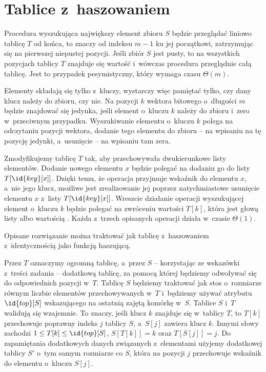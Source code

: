 \chapter{Tablice z~haszowaniem}


\exercise %
Procedura wyszukująca największy element zbioru $S$ będzie przeglądać liniowo tablicę $T$ od końca, to znaczy od indeksu $m-1$ ku jej początkowi, zatrzymując się na pierwszej niepustej pozycji. Jeśli zbiór $S$ jest pusty, to na wszystkich pozycjach tablicy $T$ znajduje się wartość  i~wówczas procedura przeglądnie całą tablicę. Jest to przypadek pesymistyczny, który wymaga czasu $\Theta(m)$.

\exercise %
Elementy składają się tylko z~kluczy, wystarczy więc pamiętać tylko, czy dany klucz należy do zbioru, czy nie. Na pozycji $k$ wektora bitowego o~długości $m$ będzie znajdować się jedynka, jeśli element o~kluczu $k$ należy do zbioru i~zero w~przeciwnym przypadku. Wyszukiwanie elementu o~kluczu $k$ polega na odczytaniu  pozycji wektora, dodanie tego elementu do zbioru -- na wpisaniu na tę pozycję jedynki, a~usunięcie -- na wpisaniu tam zera.

\exercise %
Zmodyfikujemy tablicę $T$ tak, aby przechowywała dwukierunkowe listy elementów. Dodanie nowego elementu $x$ będzie polegać na dodaniu go do listy $T[\id{key}[x]]$. Dzięki temu, że operacja  przyjmuje wskaźnik do elementu $x$, a~nie jego klucz, możliwe jest zrealizowanie jej poprzez natychmiastowe usunięcie elementu $x$ z~listy $T[\id{key}[x]]$. Wreszcie działanie operacji wyszukującej element o~kluczu $k$ będzie polegać na zwróceniu wartości $T[k]$, która jest głową listy albo wartością . Każda z~trzech opisanych operacji działa w~czasie $\Theta(1)$.

Opisane rozwiązanie można traktować jak tablicę z~haszowaniem z~identycznością jako funkcją haszującą.

\exercise %

\noindent Przez $T$ oznaczymy ogromną tablicę, a~przez $S$ -- korzystając ze wskazówki z~treści zadania -- dodatkową tablicę, za pomocą której będziemy odwoływać się do odpowiednich pozycji w~$T$. Tablicę $S$ będziemy traktować jak stos o~rozmiarze równym liczbie elementów przechowywanych w~$T$ i~będziemy używać atrybutu $\id{top}[S]$ wskazującego na ostatnią zajętą komórkę w~$S$. Tablice $S$ i~$T$ walidują się wzajemnie. To znaczy, jeśli klucz $k$ znajduje się w~tablicy $T$, to $T[k]$ przechowuje poprawny indeks $j$ tablicy $S$, a~$S[j]$ zawiera klucz $k$. Innymi słowy zachodzi $1\le T[k]\le\id{top}[S]$, $S[T[k]]=k$ oraz $T[S[j]]=j$. Do zapamiętania dodatkowych danych związanych z~elementami użyjemy dodatkowej tablicy $S'$ o~tym samym rozmiarze co $S$, która na pozycji $j$ przechowuje wskaźnik do elementu o~kluczu $S[j]$.

